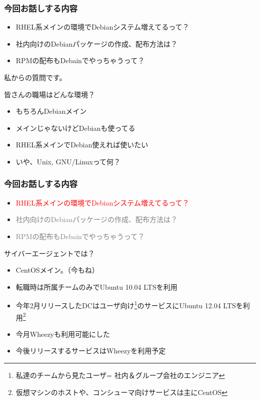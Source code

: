 \begin{frame}
  \frametitle{今回お話しする内容}
  \begin{itemize}
  \item RHEL系メインの環境でDebianシステム増えてるって？
  \item 社内向けのDebianパッケージの作成、配布方法は？
  \item RPMの配布もDebainでやっちゃうって？
  \end{itemize}
\end{frame}


\begin{frame}
\begin{center}
{\Huge 私からの質問です。}
\end{center}
\end{frame}

\begin{frame}{皆さんの職場はどんな環境？}
 \begin{itemize}
  \item[A.] もちろんDebianメイン
  \item[B.] メインじゃないけどDebianも使ってる
  \item[C.] RHEL系メインでDebian使えれば使いたい
  \item[D.] いや、Unix, GNU/Linuxって何？
 \end{itemize}
\end{frame}

\begin{frame}
  \frametitle{今回お話しする内容}
  \begin{itemize}
  \item \textcolor{red}{RHEL系メインの環境でDebianシステム増えてるって？}
  \item \textcolor{gray}{社内向けのDebianパッケージの作成、配布方法は？}
  \item \textcolor{gray}{RPMの配布もDebainでやっちゃうって？}
  \end{itemize}
\end{frame}


\begin{frame}{サイバーエージェントでは？}
 \begin{itemize}
  \item[1.] CentOSメイン。（今もね）
  \item[2.] 転職時は所属チームのみでUbuntu 10.04 LTSを利用
  \item[3.] 今年2月リリースしたDCはユーザ向け\footnote{私達のチームから見たユーザ=
社内＆グループ会社のエンジニア}のサービスにUbuntu 12.04 LTSを利用\footnote{仮想マシンのホストや、コンシューマ向けサービスは主にCentOS}
  \item[4.] 今月Wheezyも利用可能にした
  \item[5.] 今後リリースするサービスはWheezyを利用予定
 \end{itemize}
\end{frame}

